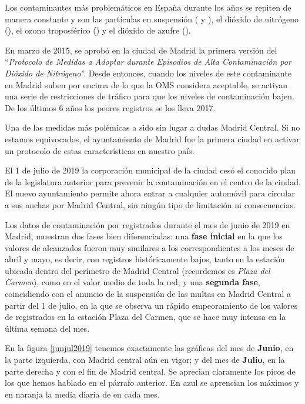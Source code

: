 \begin{itemize}
	Los contaminantes más problemáticos en España durante los años se repiten de manera constante y son las	partículas en suspensión ( y ), el dióxido de nitrógeno (), el ozono troposférico () y el dióxido de azufre (). 
	
	En marzo de 2015, se aprobó en la ciudad de Madrid la primera versión del “\textit{Protocolo de Medidas a Adoptar durante Episodios de Alta Contaminación por Dióxido de Nitrógeno}”. Desde entonces, cuando los niveles de este contaminante en Madrid suben por encima de lo que la OMS considera aceptable, se activan una serie de restricciones de tráfico para que los niveles de contaminación bajen. De los últimos 6 años los peores registros se los lleva 2017. 
	
	Una de las medidas más polémicas a sido sin lugar a dudas Madrid Central. Si no estamos equivocados, el ayuntamiento de Madrid fue la primera ciudad en activar un protocolo \cite{protocolo} de estas características en nuestro país. 

	El 1 de julio de 2019 la corporación municipal de la ciudad cesó el conocido plan de la legislatura anterior para prevenir la contaminación en el centro de la ciudad. El nuevo ayuntamiento permite ahora entrar a cualquier automóvil para circular a sus anchas por Madrid Central, sin ningún tipo de
	limitación ni consecuencias. 
		
		Los datos de contaminación por  registrados durante el mes de junio de 2019 en Madrid, muestran dos fases bien diferenciadas: una \textbf{fase inicial} en la que los valores de  alcanzados fueron muy similares a los correspondientes a los meses de abril y mayo, es
		decir, con registros históricamente bajos, tanto en la estación ubicada dentro del perímetro de Madrid Central (recordemos es \textit{Plaza del Carmen}), como en el valor medio de toda la red; y una \textbf{segunda fase}, coincidiendo con el anuncio de la
		suspensión de las multas en Madrid Central a partir del 1 de julio, en la que se observa un rápido empeoramiento de los valores de  registrados en la estación Plaza del Carmen, que se hace muy intensa en la última semana
		del mes. 
		
		En la figura \ref{junjul2019} tenemos exactamente las gráficas del mes de \textbf{Junio}, en la parte izquierda, con Madrid central aún en vigor; y del mes de \textbf{Julio}, en la parte derecha y con el fin de Madrid central. Se aprecian claramente los picos de los que hemos hablado en el párrafo anterior. En azul se aprencian los máximos y en naranja la media diaria de  en cada mes.
		

\end{itemize}
